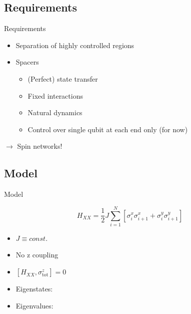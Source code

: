 \documentclass{beamer}
\begin{document}
\subsection{Requirements}
\begin{frame}{Requirements}
	\begin{itemize}
		\item Separation of highly controlled regions
		\item Spacers
		\begin{itemize}
			\item (Perfect) state transfer
			\item Fixed interactions
			\item Natural dynamics
			\item Control over single qubit at each end only (for now)
		\end{itemize}
	\end{itemize}
	
	$\rightarrow$ Spin networks!
\end{frame}

\subsection{Model}
\begin{frame}[t]{Model}	
	\begin{exampleblock}{}
	\setlength\abovedisplayskip{-8pt}
	\begin{center}
		\[H_{XX}=\frac{1}{2}J\sum_{i=1}^{N}{\left[\sigma_i^x\sigma_{i+1}^x + \sigma_i^y\sigma_{i+1}^y\right]}\]
	\end{center}
	\end{exampleblock}
	\begin{itemize}
		\item $J\equiv const.$
		\item No z coupling
		\item $\left[H_{XX},\sigma^z_\text{tot}\right] = 0$
		\item Eigenstates: $ $
		\item Eigenvalues: $ $
	\end{itemize}
\end{frame}
\end{document}
